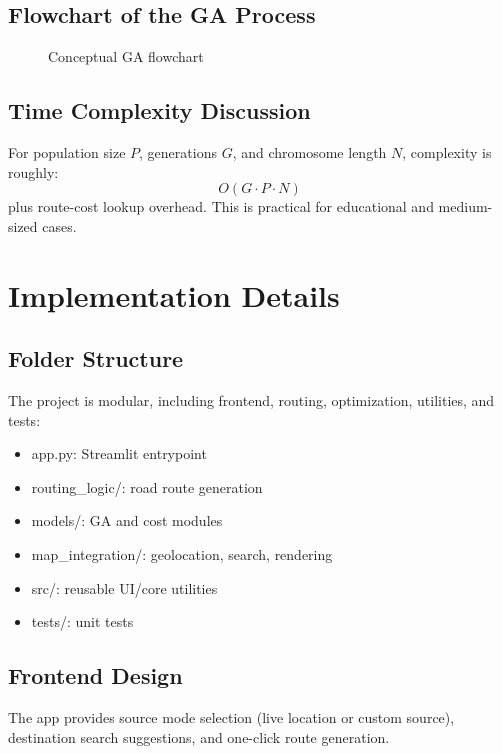 \documentclass[12pt,a4paper]{report}
\begin{document}
\section{Flowchart of the GA Process}
\begin{figure}[H]
\centering
{}
\caption{Conceptual GA flowchart}
\label{fig:ga-flow}
\end{figure}

\section{Time Complexity Discussion}
For population size $P$, generations $G$, and chromosome length $N$, complexity is roughly:
\begin{equation}
O(G \cdot P \cdot N)
\end{equation}
plus route-cost lookup overhead. This is practical for educational and medium-sized cases.

\chapter{Implementation Details}

\section{Folder Structure}
The project is modular, including frontend, routing, optimization, utilities, and tests:
\begin{itemize}
    \item app.py: Streamlit entrypoint
    \item routing\_logic/: road route generation
    \item models/: GA and cost modules
    \item map\_integration/: geolocation, search, rendering
    \item src/: reusable UI/core utilities
    \item tests/: unit tests
\end{itemize}

\section{Frontend Design}
The app provides source mode selection (live location or custom source), destination search suggestions, and one-click route generation.
\end{document}
